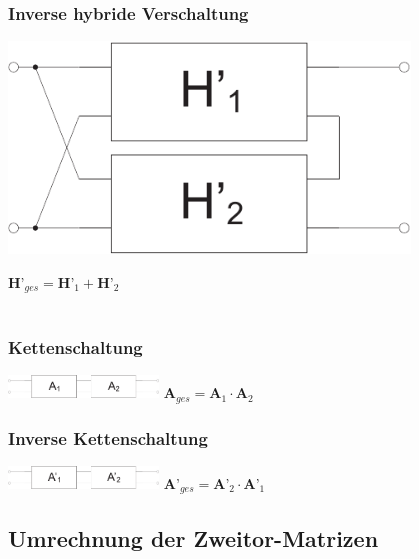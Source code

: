 \documentclass[a4paper,twocolumn,10pt]{article}
\begin{document}
\subsubsection*{Inverse hybride Verschaltung}
\begin{minipage}[b]{0.23\textwidth}
\includegraphics[width=0.8\textwidth]{img/Zweitor_inversHybrid}
\end{minipage}
\hfill
\begin{minipage}[b]{0.23\textwidth}
$\textbf{H'}_{ges}=\textbf{H'}_1+\textbf{H'}_2$\\\\
\end{minipage}

\subsubsection*{Kettenschaltung}
\includegraphics[width=0.3\textwidth, keepaspectratio]{img/Zweitor_Kette}
$\textbf{A}_{ges}=\textbf{A}_1\cdot \textbf{A}_2$

\subsubsection*{Inverse Kettenschaltung}
\includegraphics[width=0.3\textwidth]{img/Zweitor_inversKette}
$\textbf{A'}_{ges}=\textbf{A'}_2\cdot \textbf{A'}_1$

\subsection*{Umrechnung der Zweitor-Matrizen}
\end{document}
